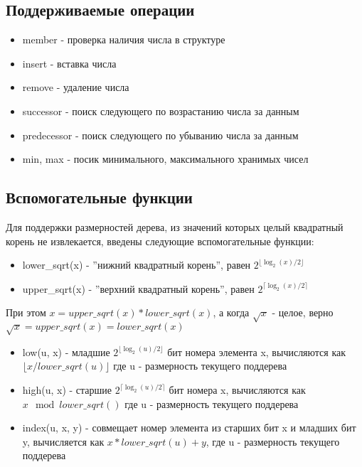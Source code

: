 \documentclass{article}
\begin{document}
\subsection{Поддерживаемые операции}
\begin{itemize}
    \item member - проверка наличия числа в структуре
    \item insert - вставка числа
    \item remove - удаление числа
    \item successor - поиск следующего по возрастанию числа за данным
    \item predecessor - поиск следующего по убыванию числа за данным
    \item min, max - посик минимального, максимального хранимых чисел 
\end{itemize}
\subsection{Вспомогательные функции}
Для поддержки размерностей дерева, из значений которых целый квадратный корень не извлекается, введены следующие вспомогательные функции:
\begin{itemize}
    \item lower\_sqrt(x) - ''нижний квадратный корень'', равен $2^{\lfloor\log_{2}(x)/2\rfloor}$
    \item upper\_sqrt(x) - ''верхний квадратный корень'', равен $2^{\lceil\log_{2}(x)/2\rceil}$
\end{itemize}
При этом $x = upper\_sqrt(x) * lower\_sqrt(x)$, а когда $\sqrt{x}$ - целое, верно $\sqrt{x} = upper\_sqrt(x) = lower\_sqrt(x)$
\begin{itemize}
    \item low(u, x) - младшие $2^{\lfloor\log_{2}(u)/2\rfloor}$ бит номера элемента x, вычисляются как $\lfloor{x/lower\_sqrt(u)}\rfloor$ где u - размерность текущего поддерева
    \item high(u, x) - старшие $2^{\lceil\log_{2}(u)/2\rceil}$ бит номера x, вычисляются как $x\mod{lower\_sqrt()}$  где u - размерность текущего поддерева
    \item index(u, x, y) - совмещает номер элемента из старших бит x и младших бит y, вычисляется как $x*lower\_sqrt(u) + y$, где u - размерность текущего поддерева
    
\end{itemize}
\end{document}
